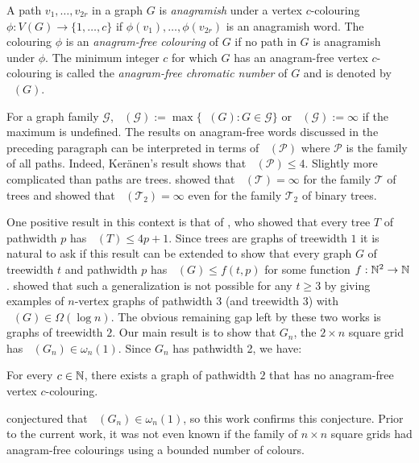 \documentclass{patmorin}
\DeclareMathOperator{\afcn}{\dot{\chi}_\pi}
\begin{document}
A path $v_1,\ldots,v_{2r}$ in a graph $G$ is \emph{anagramish} under a vertex $c$-colouring $\phi:V(G)\to\{1,\ldots,c\}$ if $\phi(v_1),\ldots,\phi(v_{2r})$ is an anagramish word.  The colouring $\phi$ is an \emph{anagram-free colouring} of $G$ if no path in $G$ is anagramish under $\phi$.  The minimum integer $c$ for which $G$ has an anagram-free vertex $c$-colouring is called the \emph{anagram-free chromatic number} of $G$ and is denoted by $\afcn(G)$.

For a graph family $\mathcal{G}$, $\afcn(\mathcal{G}):=\max\{\afcn(G):G\in\mathcal{G}\}$ or $\afcn(\mathcal{G}):=\infty$ if the maximum is undefined. The results on anagram-free words discussed in the preceding paragraph can be interpreted in terms of $\afcn(\mathcal{P})$ where $\mathcal{P}$ is the family of all paths. Indeed, Ker\"anen's result shows that $\afcn(\mathcal{P})\le 4$. Slightly more complicated than paths are trees.  \citet{wilson.wood:anagram-free} showed that $\afcn(\mathcal{T})=\infty$ for the family $\mathcal{T}$ of trees and \citet{kamcev.luczak.ea:anagram-free} showed that $\afcn(\mathcal{T}_2)=\infty$ even for the family $\mathcal{T}_2$ of binary trees.

One positive result in this context is that of
\citet{wilson.wood:anagram-free}, who showed that every tree $T$ of pathwidth $p$ has $\afcn(T)\le 4p+1$. Since trees are graphs of treewidth $1$ it is natural to ask if this result can be extended to show that every graph $G$ of treewidth $t$ and pathwidth $p$ has $\afcn(G)\le f(t,p)$ for some function $f:\mathbb{N}^2\to\mathbb{N}$.  \citet{carmi.dujmovic.ea:anagram-free} showed that such a generalization is not possible for any $t\ge 3$ by giving examples of $n$-vertex graphs of pathwidth $3$ (and treewidth $3$) with $\afcn(G)\in\Omega(\log n)$.  The obvious remaining gap left by these two works is graphs of treewidth $2$. Our main result is to show that $G_n$, the $2\times n$ square grid has $\afcn(G_n)\in\omega_n(1)$. Since $G_n$ has pathwidth 2, we have:

\begin{thm}\label{main_vertex}
    For every $c\in\mathbb{N}$, there exists a graph of pathwidth $2$ that has no anagram-free vertex $c$-colouring.
\end{thm}

\citet[Section 7.1]{wilson:anagram-free} conjectured that $\afcn(G_n)\in\omega_n(1)$, so this work confirms this conjecture.  Prior to the current work, it was not even known if the family of $n\times n$ square grids had anagram-free colourings using a bounded number of colours.
\end{document}
